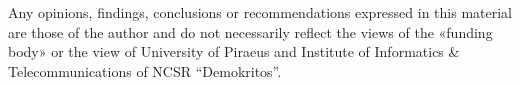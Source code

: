 \begin{flushleft}
    Any opinions, findings, conclusions or recommendations expressed in this material are those of the author and do not necessarily reflect the views of the «funding body» or the view of University of Piraeus and Institute of Informatics \& Telecommunications of NCSR “Demokritos”. 
\end{flushleft}